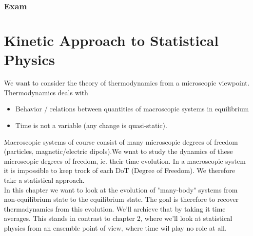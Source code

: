 \documentclass{report}
\begin{document}
\subsection*{Exam}
\tableofcontents

\newpage
{}
\chapter{Kinetic Approach to Statistical Physics}
We want to consider the theory of thermodynamics from a microscopic viewpoint. Thermodynamics deals with
\begin{itemize}
  \item Behavior / relations between quantities of macroscopic systems in equilibrium
  \item Time is not a variable (any change is quasi-static). 
\end{itemize}
Macroscopic systems of course consist of many microscopic degrees of freedom (particles, magnetic/electric dipols).We wnat to study the dynamics of these microscopic degrees of freedom, ie. their time evolution. In a macroscopic system it is impossible to keep trock of each DoT (Degree of Freedom). We therefore take a statistical approach.\\
In this chapter we want to look at the evolution of "many-body" systems from non-equilibrium state to the equilibrium state. The goal is therefore to recover thermadynamics from this evolution. We'll archieve that by taking it time averages. This stands in contrast to chapter 2, where we'll look at statistical physics from an ensemble point of view, where time wil play no role at all.\\
\end{document}
